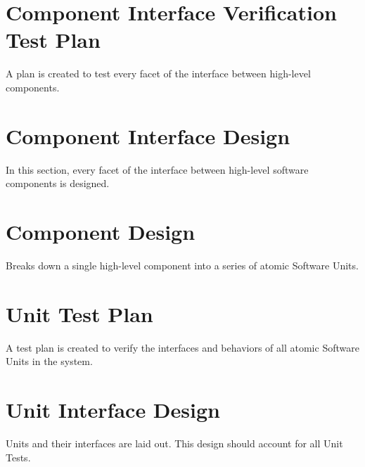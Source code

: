 \documentclass{designdoc}
\begin{document}
\section{Component Interface Verification Test Plan}
A plan is created to test every facet of the interface between high-level
components.

\section{Component Interface Design}
In this section, every facet of the interface between high-level software
components is designed.

\section{Component Design}
Breaks down a single high-level component into a series of atomic Software
Units.

\section{Unit Test Plan}
A test plan is created to verify the interfaces and behaviors of all atomic
Software Units in the system.

\section{Unit Interface Design}
Units and their interfaces are laid out. This design should account for all
Unit Tests.
\end{document}
